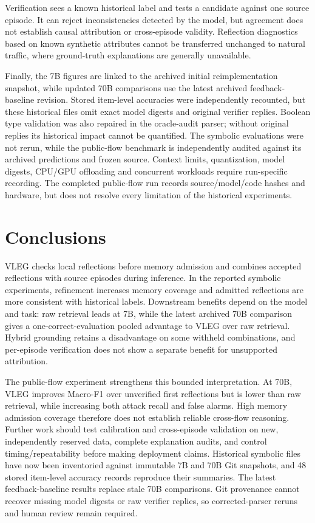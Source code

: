 \documentclass[onecolumn]{IEEEtran}
\numberwithin{equation}{section}
\theoremstyle{definition}
\theoremstyle{remark}
\begin{document}
Verification sees a known historical label and tests a candidate against one source episode. It can reject inconsistencies detected by the model, but agreement does not establish causal attribution or cross-episode validity. Reflection diagnostics based on known synthetic attributes cannot be transferred unchanged to natural traffic, where ground-truth explanations are generally unavailable.

Finally, the 7B figures are linked to the archived initial reimplementation snapshot, while updated 70B comparisons use the latest archived feedback-baseline revision. Stored item-level accuracies were independently recounted, but these historical files omit exact model digests and original verifier replies. Boolean type validation was also repaired in the oracle-audit parser; without original replies its historical impact cannot be quantified. The symbolic evaluations were not rerun, while the public-flow benchmark is independently audited against its archived predictions and frozen source. Context limits, quantization, model digests, CPU/GPU offloading and concurrent workloads require run-specific recording. The completed public-flow run records source/model/code hashes and hardware, but does not resolve every limitation of the historical experiments.

\FloatBarrier
\section{Conclusions}
VLEG checks local reflections before memory admission and combines accepted reflections with source episodes during inference. In the reported symbolic experiments, refinement increases memory coverage and admitted reflections are more consistent with historical labels. Downstream benefits depend on the model and task: raw retrieval leads at 7B, while the latest archived 70B comparison gives a one-correct-evaluation pooled advantage to VLEG over raw retrieval. Hybrid grounding retains a disadvantage on some withheld combinations, and per-episode verification does not show a separate benefit for unsupported attribution.

The public-flow experiment strengthens this bounded interpretation. At 70B, VLEG improves Macro-F1 over unverified first reflections but is lower than raw retrieval, while increasing both attack recall and false alarms. High memory admission coverage therefore does not establish reliable cross-flow reasoning. Further work should test calibration and cross-episode validation on new, independently reserved data, complete explanation audits, and control timing/repeatability before making deployment claims. Historical symbolic files have now been inventoried against immutable 7B and 70B Git snapshots, and 48 stored item-level accuracy records reproduce their summaries. The latest feedback-baseline results replace stale 70B comparisons. Git provenance cannot recover missing model digests or raw verifier replies, so corrected-parser reruns and human review remain required.



\end{document}
